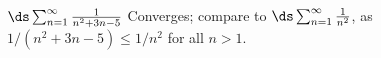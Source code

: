 {$\ds \sum_{n=1}^\infty \frac{1}{n^2+3n-5}$
}
{Converges; compare to $\ds \sum_{n=1}^\infty \frac{1}{n^2}$, as $1/(n^2+3n-5) \leq 1/n^2$ for all $n>1$. 
}